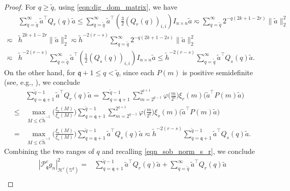\documentclass{article}
\numberwithin{equation}{section}
\def\SS{\mathbb{S}}
\def\mal{\max\limits}
\def\sul{\sum\limits}
\def\rr{ r}
\def\ss{ s}
\def\pc{\mathcal{P}^c}
\def\mq{\mathfrak{q}}
\begin{document}
\begin{proof}
For $q\geq\tilde q$, using \eqref{eqn:dig_dom_matrix}, we have
\begin{equation}
    \begin{split}
        &\sul_{q=\tilde q}^{\infty}\tilde{a}^\top Q_\rr(q)\tilde{a}
        \leq\sul_{q=\tilde q}^{\infty}\tilde{a}^\top \left(\frac{3}{2}\left(Q_{\rr}(q)\right)_{i,i}\right)I_{n\times n}\tilde{a}
        \eqsim\sul_{q=\tilde q}^{\infty}2^{-q(2k+1-2\rr)}\|\tilde{a}\|_2^2\\
        \eqsim&\tilde{h}^{2k+1-2r}\|\tilde{a}\|_2^2
        \eqsim\tilde{h}^{-2(\rr-\ss)}\sul_{q=\tilde q}^{\infty}2^{-q(2k+1-2\ss)}\|\tilde{a}\|_2^2
        \\
        \eqsim&\tilde{h}^{-2(\rr-\ss)}\sul_{q=\tilde q}^{\infty}\tilde{a}^\top \left(\frac{1}{2}\left(Q_{\ss}(q)\right)_{i,i}\right)I_{n\times n}\tilde{a}
        \leq\tilde{h}^{-2(\rr-\ss)}\sul_{q=\tilde q}^{\infty}\tilde{a}^\top Q_\ss(q)\tilde{a}.
    \end{split}
\end{equation}
On the other hand, for $\mq+1\leq q<\tilde q$, since each $P(m)$ is positive semidefinite (see, e.g., \cite[Lemma 3.4]{liu2025integral}), we conclude
\begin{equation}
    \begin{split}
        &\sul_{q=\mq+1}^{\tilde q-1}\tilde{a}^\top Q_\rr(q)\tilde{a}
        =\sul_{q=\mq+1}^{\tilde q-1}\sul_{m=2^{q-1}}^{2^{q+1}}\varphi\big(\frac{m}{2^q}\big)\xi_\rr(m)\Big(\tilde{a}^\top P(m)\tilde{a}\Big)\\
        \leq&\mal_{M\leq C\tilde h^{-1}}\Big(\frac{\xi_\rr(M)}{\xi_\ss(M)}\Big)\sul_{q=\mq+1}^{\tilde q-1}\sul_{m=2^{q-1}}^{2^{q+1}}\varphi\big(\frac{m}{2^q}\big)\xi_\ss(m)\Big(\tilde{a}^\top P(m)\tilde{a}\Big)\\
        =&\mal_{M\leq C\tilde h^{-1}}\Big(\frac{\xi_\rr(M)}{\xi_\ss(M)}\Big)\sul_{q=\mq+1}^{\tilde q-1}\tilde{a}^\top Q_\ss(q)\tilde{a}
        \eqsim\tilde{h}^{-2(\rr-\ss)}\sul_{q=\mq+1}^{\tilde q-1}\tilde{a}^\top Q_\ss(q)\tilde{a}.
    \end{split}
\end{equation}
Combining the two ranges of $q$ and recalling \eqref{eqn_sob_norm_s_r}, we conclude
\begin{equation}
    \begin{split}
        |\pc_\mq g_n|_{\mathcal{H}^\rr(\SS^d)}^2
        =&\sul_{q=\mq+1}^{\tilde q-1}\tilde{a}^\top Q_\rr(q)\tilde{a}
        +\sul_{q=\tilde q}^{\infty}\tilde{a}^\top Q_\rr(q)\tilde{a}\\

\end{split}
\end{equation}
\end{proof}
\end{document}
